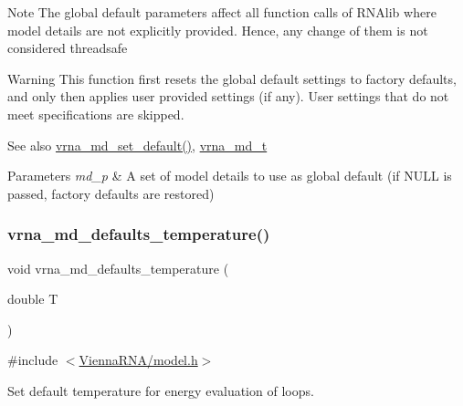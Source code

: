 \begin{DoxyNote}{Note}
The global default parameters affect all function calls of R\+N\+Alib where model details are not explicitly provided. Hence, any change of them is not considered threadsafe 
\end{DoxyNote}
\begin{DoxyWarning}{Warning}
This function first resets the global default settings to factory defaults, and only then applies user provided settings (if any). User settings that do not meet specifications are skipped. 
\end{DoxyWarning}
\begin{DoxySeeAlso}{See also}
\mbox{\hyperlink{group__model__details_ga8ac6ff84936282436f822644bf841f66}{vrna\+\_\+md\+\_\+set\+\_\+default()}}, \mbox{\hyperlink{group__model__details_ga1f8a10e12a0a1915f2a4eff0b28ea17c}{vrna\+\_\+md\+\_\+t}}
\end{DoxySeeAlso}

\begin{DoxyParams}{Parameters}
{\em md\+\_\+p} & A set of model details to use as global default (if N\+U\+LL is passed, factory defaults are restored) \\
\hline
\end{DoxyParams}
\mbox{\label{group__model__details_gaf9e527e9a2f7e6fd6e42bc6e602f5445}} 
\subsubsection{\texorpdfstring{vrna\+\_\+md\+\_\+defaults\+\_\+temperature()}{vrna\_md\_defaults\_temperature()}}
{\footnotesize\ttfamily void vrna\+\_\+md\+\_\+defaults\+\_\+temperature (\begin{DoxyParamCaption}\item[{double}]{T }\end{DoxyParamCaption})}



{\ttfamily \#include $<$\mbox{\hyperlink{model_8h}{Vienna\+R\+N\+A/model.\+h}}$>$}



Set default temperature for energy evaluation of loops. 

